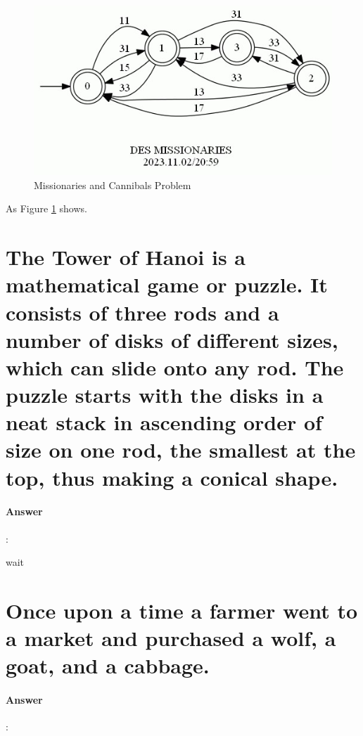 \documentclass{article}
\begin{document}
\begin{figure}[h!]
  \centering
  \includegraphics{assets/MISSIONARIES.jpg}
  \caption{Missionaries and Cannibals Problem}
  \label{fig:des65}
\end{figure}

As Figure \ref{fig:des65} shows.

\section{The Tower of Hanoi is a mathematical game or puzzle. It consists of three rods and a number of disks of different sizes, which can slide onto any rod. The puzzle starts with the disks in a neat stack in ascending order of size on one rod, the smallest at the top, thus making a conical shape.}

\paragraph{Answer}:

wait


\section{Once upon a time a farmer went to a market and purchased a wolf, a goat, and a cabbage.}

\paragraph{Answer}:
\end{document}
